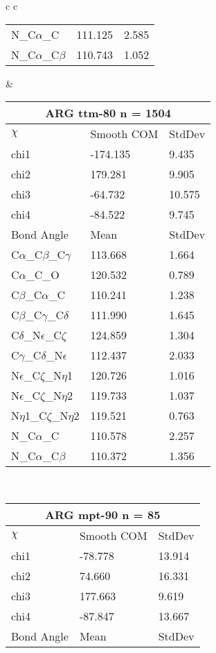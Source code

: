 \begin{longtable}{ c c }
\begin{tabular}{ l l l }
  N\_C$\alpha$\_C & 111.125 & 2.585\\
  N\_C$\alpha$\_C$\beta$ & 110.743 & 1.052\\
  \bottomrule
  \end{tabular}
  &
  \begin{tabular}{ l l l }
  \toprule
  \multicolumn{3}{c}{ARG \textbf{ttm-80} n = 1504} \\ \toprule
  $\chi$       & Smooth COM & StdDev \\ \midrule
  chi1 & -174.135 & 9.435 \\ 
  chi2 & 179.281 & 9.905 \\ 
  chi3 & -64.732 & 10.575 \\ 
  chi4 & -84.522 & 9.745 \\ \midrule
  Bond Angle   & Mean     & StdDev \\ \midrule
  C$\alpha$\_C$\beta$\_C$\gamma$ & 113.668 & 1.664\\
  C$\alpha$\_C\_O & 120.532 & 0.789\\
  C$\beta$\_C$\alpha$\_C & 110.241 & 1.238\\
  C$\beta$\_C$\gamma$\_C$\delta$ & 111.990 & 1.645\\
  C$\delta$\_N$\epsilon$\_C$\zeta$ & 124.859 & 1.304\\
  C$\gamma$\_C$\delta$\_N$\epsilon$ & 112.437 & 2.033\\
  N$\epsilon$\_C$\zeta$\_N$\eta$1 & 120.726 & 1.016\\
  N$\epsilon$\_C$\zeta$\_N$\eta$2 & 119.733 & 1.037\\
  N$\eta$1\_C$\zeta$\_N$\eta$2 & 119.521 & 0.763\\
  N\_C$\alpha$\_C & 110.578 & 2.257\\
  N\_C$\alpha$\_C$\beta$ & 110.372 & 1.356\\
  \bottomrule
  \end{tabular}
  \\
  \begin{tabular}{ l l l }
  \toprule
  \multicolumn{3}{c}{ARG \textbf{mpt-90} n = 85} \\ \toprule
  $\chi$       & Smooth COM & StdDev \\ \midrule
  chi1 & -78.778 & 13.914 \\ 
  chi2 & 74.660 & 16.331 \\ 
  chi3 & 177.663 & 9.619 \\ 
  chi4 & -87.847 & 13.667 \\ \midrule
  Bond Angle   & Mean     & StdDev \\ \midrule

\end{tabular}
\end{longtable}
